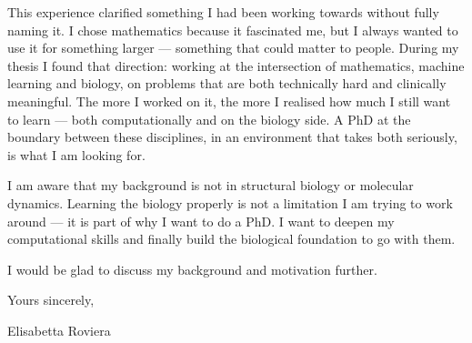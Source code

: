 \documentclass[12pt]{article}
\begin{document}
This experience clarified something I had been working towards without fully naming it. I chose mathematics because it fascinated me, but I always wanted to use it for something larger — something that could matter to people. During my thesis I found that direction: working at the intersection of mathematics, machine learning and biology, on problems that are both technically hard and clinically meaningful. The more I worked on it, the more I realised how much I still want to learn — both computationally and on the biology side. A PhD at the boundary between these disciplines, in an environment that takes both seriously, is what I am looking for.

I am aware that my background is not in structural biology or molecular dynamics. Learning the biology properly is not a limitation I am trying to work around — it is part of why I want to do a PhD. I want to deepen my computational skills and finally build the biological foundation to go with them.

I would be glad to discuss my background and motivation further.

\bigskip

Yours sincerely,

\bigskip\bigskip

Elisabetta Roviera
\end{document}
